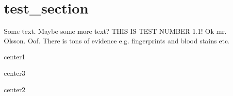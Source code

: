 \section{test_section} Some text. Maybe some more text? THIS IS TEST NUMBER 1.1! Ok mr. Olsson. 
Oof. There is tons of evidence e.g. fingerprints and blood stains etc.
\begin{center}
center1
\begin{center}
\begin{center}
center3
\end{center}
center2
\end{center}
\end{center}